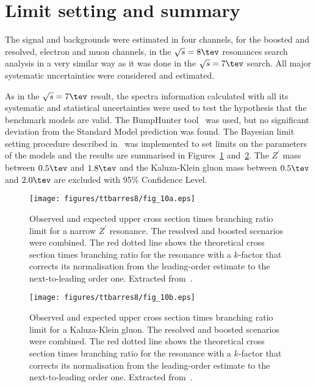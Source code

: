 \clearpage





\section{Limit setting and summary}

The signal and backgrounds were estimated in four channels, for the boosted and resolved, electron and muon channels, in
the $\sqrt{s} = 8\tev$ \ttbar resonances search analysis in a very similar way as it was done in the $\sqrt{s} = 7\tev$
search. All major  systematic uncertainties were considered and estimated.

As in the $\sqrt{s} = 7\tev$ result, the spectra information calculated with all its systematic and statistical uncertainties were used to test the hypothesis that
the benchmark models are valid. The BumpHunter tool~\cite{bumphunter} was used, but no significant deviation from the Standard Model prediction was found.
The Bayesian limit setting procedure described in~\cite{limitsetting} was implemented to set limits on the parameters of the models and the results are summarised in
Figures~\ref{fig:ttbarres8_limitzp} and~\ref{fig:ttbarres8_limitkkg}.
The $Z^{\prime}$ mass between $0.5\tev$ and $1.8\tev$ and the Kaluza-Klein gluon mass between $0.5\tev$ and $2.0\tev$ are excluded with 95\% Confidence Level. 

\begin{figure}
\centering
\texttt{[image: figures/ttbarres8/fig\_10a.eps]}
\caption{Observed and expected upper cross section times branching ratio limit for a narrow $Z^{\prime}$ resonance. The resolved and boosted scenarios were combined. The red dotted line shows the theoretical cross section times branching ratio for the resonance with a $k$-factor that corrects its normalisation from the leading-order estimate to the next-to-leading order one. Extracted from~\cite{ttres8note}.}
\label{fig:ttbarres8_limitzp}
\end{figure}

\begin{figure}
\centering
\texttt{[image: figures/ttbarres8/fig\_10b.eps]}
\caption{Observed and expected upper cross section times branching ratio limit for a Kaluza-Klein gluon. The resolved and boosted scenarios were combined. The red dotted line shows the theoretical cross section times branching ratio for the resonance with a $k$-factor that corrects its normalisation from the leading-order estimate to the next-to-leading order one. Extracted from~\cite{ttres8note}.}
\label{fig:ttbarres8_limitkkg}
\end{figure}
